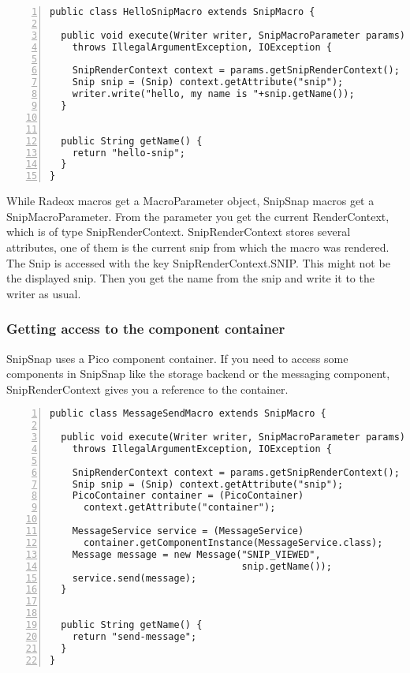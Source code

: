 \documentclass[a4paper,pdftex]{article}
\begin{document}
\begin{Verbatim}[gobble=0,frame=single,numbers=left,fontsize=\small]
public class HelloSnipMacro extends SnipMacro {

  public void execute(Writer writer, SnipMacroParameter params)
    throws IllegalArgumentException, IOException {

    SnipRenderContext context = params.getSnipRenderContext();
    Snip snip = (Snip) context.getAttribute("snip");
    writer.write("hello, my name is "+snip.getName());
  }


  public String getName() {
    return "hello-snip";
  }
}
\end{Verbatim}

While Radeox macros get a MacroParameter object, SnipSnap macros get a SnipMacroParameter. From the parameter
you get the current RenderContext, which is of type SnipRenderContext. SnipRenderContext stores several attributes,
one of them is the current snip from which the macro was rendered. The Snip is accessed with the key SnipRenderContext.SNIP.
This might not be the displayed snip. Then you get the name from the snip and write it to the writer as usual.

\subsubsection{Getting access to the component container}

SnipSnap uses a Pico component container\cite{PicoContainer}. If you need
to access some components in SnipSnap like the storage backend or the messaging
component, SnipRenderContext gives you a reference to the container.

\begin{Verbatim}[gobble=0,frame=single,numbers=left,fontsize=\small]
public class MessageSendMacro extends SnipMacro {

  public void execute(Writer writer, SnipMacroParameter params)
    throws IllegalArgumentException, IOException {

    SnipRenderContext context = params.getSnipRenderContext();
    Snip snip = (Snip) context.getAttribute("snip");
    PicoContainer container = (PicoContainer)
      context.getAttribute("container");

    MessageService service = (MessageService)
      container.getComponentInstance(MessageService.class);
    Message message = new Message("SNIP_VIEWED",
                                  snip.getName());
    service.send(message);
  }


  public String getName() {
    return "send-message";
  }
}
\end{Verbatim}
\end{document}
